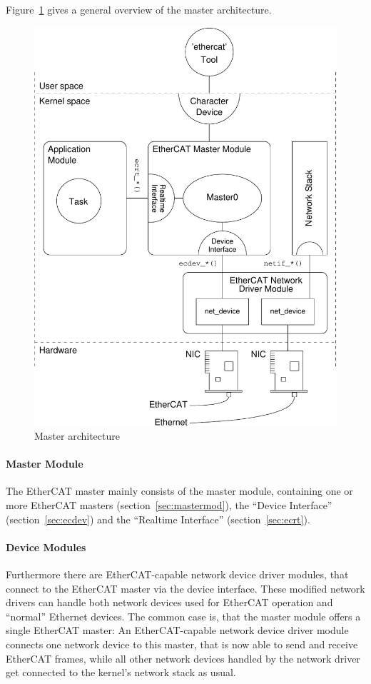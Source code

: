 \documentclass[a4paper,12pt,BCOR6mm,bibtotoc,idxtotoc]{scrbook}
\begin{document}
Figure~\ref{fig:arch} gives a general overview of the master architecture.

\begin{figure}[htbp]
  \centering
  \includegraphics[width=.9\textwidth]{images/architecture}
  \caption{Master architecture}
  \label{fig:arch}
\end{figure}

\paragraph{Master Module}

The EtherCAT master mainly consists of the master module, containing one or
more EtherCAT masters (section~\ref{sec:mastermod}), the ``Device Interface''
(section~\ref{sec:ecdev}) and the ``Realtime Interface''
(section~\ref{sec:ecrt}).

\paragraph{Device Modules}

Furthermore there are EtherCAT-capable network device driver
modules, that connect to the EtherCAT master via the
device interface. These modified network drivers can handle both network
devices used for EtherCAT operation and ``normal'' Ethernet devices. The
common case is, that the master module offers a single EtherCAT master: An
EtherCAT-capable network device driver module connects one network device to
this master, that is now able to send and receive EtherCAT frames, while all
other network devices handled by the network driver get connected to the
kernel's network stack as usual.
\end{document}
